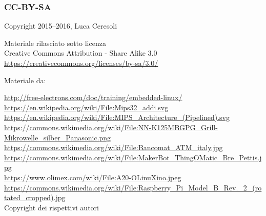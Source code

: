 \documentclass[xetex,table]{beamer}
\begin{document}
\begin{frame}
\frametitle{CC-BY-SA}
  \begin{center}
    \textcopyright{} Copyright 2015--2016, Luca Ceresoli\\

  \vspace{0.05\textheight}

   \small
   Materiale rilasciato sotto licenza\\
   Creative Commons Attribution - Share Alike 3.0 \\
   \url{https://creativecommons.org/licenses/by-sa/3.0/} \\
  \end{center}

  \vspace{0.05\textheight}

  Materiale da:

  \vspace{0.01\textheight}
  \begin{tiny}
    {
      \setlength{\parskip}{0cm plus0mm minus3mm}
      \fontsize{4}{0}
      \url{http://free-electrons.com/doc/training/embedded-linux/}\\
      \url{https://en.wikipedia.org/wiki/File:Mips32_addi.svg}\\
      \url{https://en.wikipedia.org/wiki/File:MIPS_Architecture_(Pipelined).svg}\\
      \url{https://commons.wikimedia.org/wiki/File:NN-K125MBGPG_Grill-Mikrowelle_silber_Panasonic.png}\\
      \url{https://commons.wikimedia.org/wiki/File:Bancomat_ATM_italy.jpg}\\
      \url{https://commons.wikimedia.org/wiki/File:MakerBot_ThingOMatic_Bre_Pettis.jpg}\\
      \url{https://www.olimex.com/wiki/File:A20-OLinuXino.jpeg}\\
      \url{https://commons.wikimedia.org/wiki/File:Raspberry_Pi_Model_B_Rev._2_(rotated_cropped).jpg}\\
      \textcopyright{} Copyright dei rispettivi autori
    }
  \end{tiny}
\end{frame}
\end{document}
